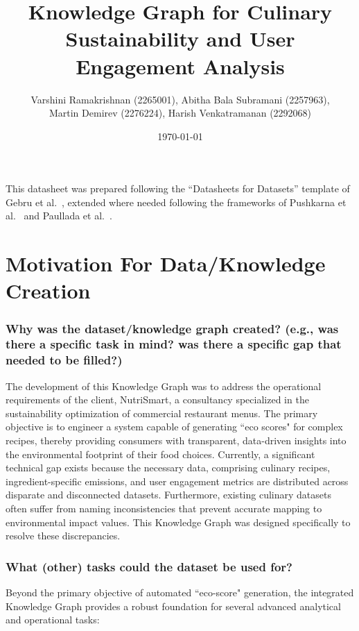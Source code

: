 \documentclass{article}
\title{Knowledge Graph for Culinary Sustainability and User Engagement Analysis}
\author{Varshini Ramakrishnan (2265001), Abitha Bala Subramani (2257963), \\
Martin Demirev (2276224), Harish Venkatramanan (2292068)}
\newcommand{\question}[1]{#1}
\begin{document}
\date{\today}
\maketitle

This datasheet was prepared following the ``Datasheets for Datasets'' template of Gebru et al.\ \cite{gebru}, extended where needed following the frameworks of Pushkarna et al.\ \cite{pushkarna} and Paullada et al.\ \cite{Paullada}.

\section{Motivation For Data/Knowledge Creation}

\question{\subsubsection*{Why was the dataset/knowledge graph created? (e.g., was there a specific task in mind? was there a specific gap that needed to
be filled?)}}

The development of this Knowledge Graph was to address the operational requirements of the client, NutriSmart, a consultancy specialized in the sustainability optimization of commercial restaurant menus. The primary objective is to engineer a system capable of generating ``eco scores" for complex recipes, thereby providing consumers with transparent, data-driven insights into the environmental footprint of their food choices. Currently, a significant technical gap exists because the necessary data, comprising culinary recipes, ingredient-specific emissions, and user engagement metrics are distributed across disparate and disconnected datasets. Furthermore, existing culinary datasets often suffer from naming inconsistencies that prevent accurate mapping to environmental impact values. This Knowledge Graph was designed specifically to resolve these discrepancies.

\question{\subsubsection*{What (other) tasks could the dataset be used for?}}


Beyond the primary objective of automated ``eco-score" generation, the integrated Knowledge Graph provides a robust foundation for several advanced analytical and operational tasks:
\end{document}
